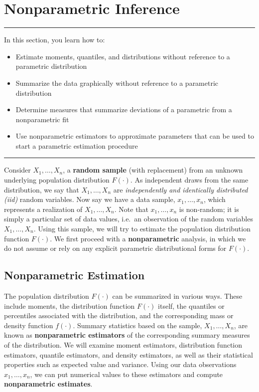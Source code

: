 \documentclass[]{book}
\providecommand{\tightlist}{%
  \setlength{\itemsep}{0pt}\setlength{\parskip}{0pt}}
\theoremstyle{definition}
\theoremstyle{definition}
\theoremstyle{definition}
\theoremstyle{remark}
\begin{document}
\section{Nonparametric Inference}\label{S:MS:NonParInf}

\begin{center}\rule{0.5\linewidth}{\linethickness}\end{center}

In this section, you learn how to:

\begin{itemize}
\tightlist
\item
  Estimate moments, quantiles, and distributions without reference to a
  parametric distribution
\item
  Summarize the data graphically without reference to a parametric
  distribution
\item
  Determine measures that summarize deviations of a parametric from a
  nonparametric fit
\item
  Use nonparametric estimators to approximate parameters that can be
  used to start a parametric estimation procedure
\end{itemize}

\begin{center}\rule{0.5\linewidth}{\linethickness}\end{center}

Consider \(X_1, \ldots, X_n\), a \textbf{random sample} (with
replacement) from an unknown underlying population distribution
\(F(\cdot)\). As independent draws from the same distribution, we say
that \(X_1, \ldots, X_n\) are \emph{independently and identically
distributed (iid)} random variables. Now say we have a data sample,
\(x_1, \dots, x_n\), which represents a realization of
\(X_1, \ldots, X_n\). Note that \(x_1, \ldots, x_n\) is non-random; it
is simply a particular set of data values, i.e.~an observation of the
random variables \(X_1, \ldots, X_n\). Using this sample, we will try to
estimate the population distribution function \(F(\cdot)\). We first
proceed with a \textbf{nonparametric} analysis, in which we do not
assume or rely on any explicit parametric distributional forms for
\(F(\cdot)\).

\subsection{Nonparametric Estimation}\label{nonparametric-estimation}

The population distribution \(F(\cdot)\) can be summarized in various
ways. These include moments, the distribution function \(F(\cdot)\)
itself, the quantiles or percentiles associated with the distribution,
and the corresponding mass or density function \(f(\cdot)\). Summary
statistics based on the sample, \(X_1, \ldots, X_n\), are known as
\textbf{nonparametric estimators} of the corresponding summary measures
of the distribution. We will examine moment estimators, distribution
function estimators, quantile estimators, and density estimators, as
well as their statistical properties such as expected value and
variance. Using our data observations \(x_1, \ldots, x_n\), we can put
numerical values to these estimators and compute \textbf{nonparametric
estimates}.
\end{document}
